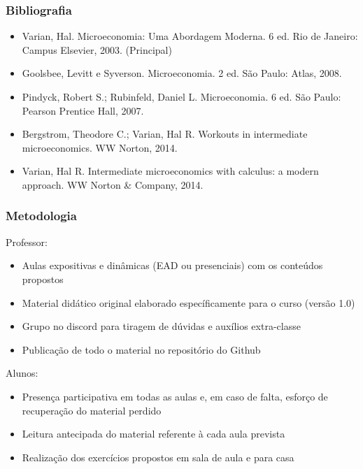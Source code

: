 \documentclass{beamer}[10]
\begin{document}
\begin{frame}
	\frametitle{Bibliografia}
	\begin{itemize}
		\item Varian, Hal. Microeconomia: Uma Abordagem Moderna. 6 ed. Rio de Janeiro: Campus Elsevier, 2003. (Principal)
		\item Goolsbee, Levitt e Syverson. Microeconomia. 2 ed. São Paulo: Atlas, 2008.
		\item Pindyck, Robert S.; Rubinfeld, Daniel L. Microeconomia. 6 ed. São Paulo: Pearson Prentice Hall, 2007.
		\item Bergstrom, Theodore C.; Varian, Hal R. Workouts in intermediate microeconomics. WW Norton, 2014.
		\item Varian, Hal R. Intermediate microeconomics with calculus: a modern approach. WW Norton \& Company, 2014.
	\end{itemize}
\end{frame}

\begin{frame}
	\frametitle{Metodologia}
	
	Professor:
	\begin{itemize}
		\item Aulas expositivas e dinâmicas (EAD ou presenciais) com os conteúdos propostos
		\item Material didático original elaborado específicamente para o curso (versão 1.0)
		\item Grupo no discord para tiragem de dúvidas e auxílios extra-classe
		\item Publicação de todo o material no repositório do Github
	\end{itemize}

	Alunos:
	\begin{itemize}
		\item Presença participativa em todas as aulas e, em caso de falta, esforço de recuperação do material perdido
		\item Leitura antecipada do material referente à cada aula prevista
		\item Realização dos exercícios propostos em sala de aula e para casa
	\end{itemize}

\end{frame}
\end{document}
